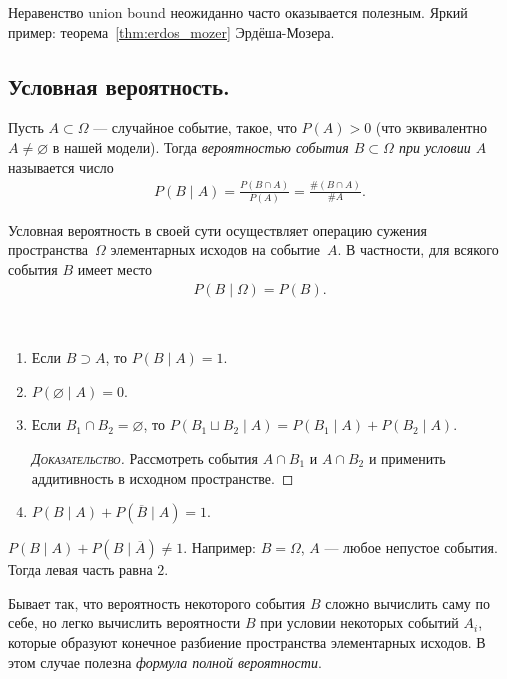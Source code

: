 \documentclass[../main.tex]{subfiles}
\begin{document}
Неравенство union bound неожиданно часто оказывается полезным. Яркий пример: теорема~\ref{thm:erdos_mozer} Эрдёша-Мозера.

\subsection{Условная вероятность.}

\begin{df}
 \label{df:conditinal_probability}
 Пусть $ A \subset \Omega $ --- случайное событие, такое, что $ P(A) > 0 $ (что эквивалентно $ A \neq \varnothing $ в нашей модели). Тогда \textit{вероятностью события $ B \subset \Omega $ при условии $ A $} называется  число
 \begin{align*}
  P(B \mid A) = \frac{P(B \cap A)}{P(A)} = \frac{\# (B \cap A)}{\# A}.
 \end{align*}
\end{df}

Условная вероятность в своей сути осуществляет операцию сужения пространства~$ \Omega $ элементарных исходов на событие~$ A $. В частности, для всякого события $ B $ имеет место
\begin{align*}
 P(B \mid \Omega) = P(B).
\end{align*}

\begin{prop}\
 \begin{enumerate}
  \item Если $B \supset A$, то $P(B \mid A) = 1$.
  \item $P(\varnothing \mid A) = 0$.
  \item Если $B_1 \cap B_2 = \varnothing$, то $P(B_1 \sqcup B_2 \mid A) = P(B_1 \mid A) + P(B_2 \mid A) $.
   \begin{proof}[\normalfont\textsc{Доказательство}]
    Рассмотреть события $A \cap B_1$ и $A \cap B_2$ и применить аддитивность в исходном пространстве.
   \end{proof}
  \item $P(B \mid A) + P(\overline B \mid A) = 1$.
 \end{enumerate} 
\end{prop}

\begin{remrk*}
 $P(B \mid A) + P(B \mid \overline A) \neq 1$. Например: $B = \Omega$, $A$ --- любое непустое события. Тогда левая часть равна $2$.
\end{remrk*}

Бывает так, что вероятность некоторого события $ B $ сложно вычислить саму по себе, но легко вычислить вероятности $ B $ при условии некоторых событий $ A_i $, которые образуют конечное разбиение пространства элементарных исходов. В этом случае полезна \textit{формула полной вероятности}.
\end{document}
